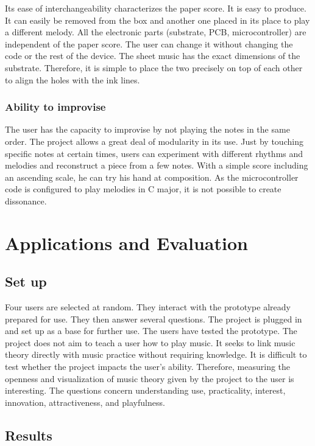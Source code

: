 Its ease of interchangeability characterizes the paper score. It is easy to produce. It
can easily be removed from the box and another one placed in its place to play a
different melody. All the electronic parts (substrate, PCB, microcontroller) are
independent of the paper score. The user can change it without changing the code or
the rest of the device. The sheet music has the exact dimensions of the substrate.
Therefore, it is simple to place the two precisely on top of each other to align the
holes with the ink lines.

\subsubsection{Ability to improvise} 

The user has the capacity to improvise by not playing the notes in the same order.
The project allows a great deal of modularity in its use. Just by touching specific
notes at certain times, users can experiment with different rhythms and melodies
and reconstruct a piece from a few notes.
With a simple score including an ascending scale, he can try his hand at composition.
As the microcontroller code is configured to play melodies in C major, it is not
possible to create dissonance.


\section{Applications and Evaluation}

\subsection{Set up}

Four users are selected at random. They interact with the prototype already prepared for use. They then answer several questions. The project is plugged in and set up as a base for further use. The users have tested the prototype. The project does not aim to teach a user how to play music. It seeks to link music theory directly with music practice without requiring knowledge.
It is difficult to test whether the project impacts the user's ability. Therefore, measuring the openness and visualization of music theory given by the project to the user is interesting. The questions concern understanding use, practicality, interest, innovation, attractiveness, and playfulness.

\subsection{Results}

